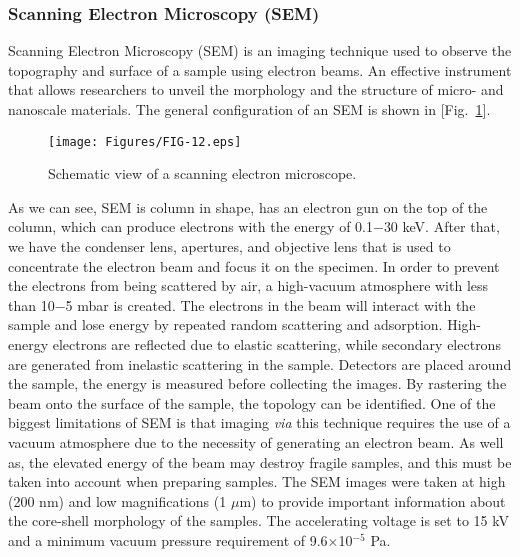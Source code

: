 \documentclass[reprint,amsmath,amssymb,aps,floatfix,
]{revtex4-2}
\begin{document}
\subsubsection{Scanning Electron Microscopy (SEM)}
Scanning Electron Microscopy (SEM) is an imaging technique used to observe the topography and surface of a sample using electron beams. An effective instrument that allows researchers to unveil the morphology and the structure of micro- and nanoscale materials. The general configuration of an SEM is shown in [Fig.~\ref{fig:fig12}].
\begin{figure}[b]
    \centering
    \texttt{[image: Figures/FIG-12.eps]}
    \caption{\label{fig:fig12}Schematic view of a scanning electron microscope.}
    \end{figure}
As we can see, SEM is column in shape, has an electron gun on the top of the column, which can produce electrons with the energy of 0.1$-$30 keV. After that, we have the condenser lens, apertures, and objective lens that is used to concentrate the electron beam and focus it on the specimen. In order to prevent the electrons from being scattered by air, a high-vacuum atmosphere with less than 10$-$5 mbar is created. The electrons in the beam will interact with the sample and lose energy by repeated random scattering and adsorption. High-energy electrons are reflected due to elastic scattering, while secondary electrons are generated from inelastic scattering in the sample. Detectors are placed around the sample, the energy is measured before collecting the images. By rastering the beam onto the surface of the sample, the topology can be identified. One of the biggest limitations of SEM is that imaging {\it via} this technique requires the use of a vacuum atmosphere due to the necessity of generating an electron beam. As well as, the elevated energy of the beam may destroy fragile samples, and this must be taken into account when preparing samples. The SEM images were taken at high (200 nm) and low magnifications (1 $\mu$m) to provide important information about the core-shell morphology of the samples. The accelerating voltage is set to 15 kV and a minimum vacuum pressure requirement of 9.6$\times$10$^{-5}$ Pa.
\end{document}
